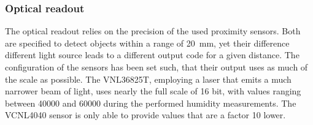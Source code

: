 \subsubsection{Optical readout}
The optical readout relies on the precision of the used proximity sensors. Both are specified to detect objects within a range of \qty{20}{\mm}, yet their difference different light source leads to a different output code for a given distance. The configuration of the sensors has been set such, that their output uses as much of the scale as possible. The VNL36825T, employing a laser that emits a much narrower beam of light, uses nearly the full scale of 16 bit, with values ranging between 40000 and 60000 during the performed humidity measurements. The VCNL4040 sensor is only able to provide values that are a factor 10 lower.

